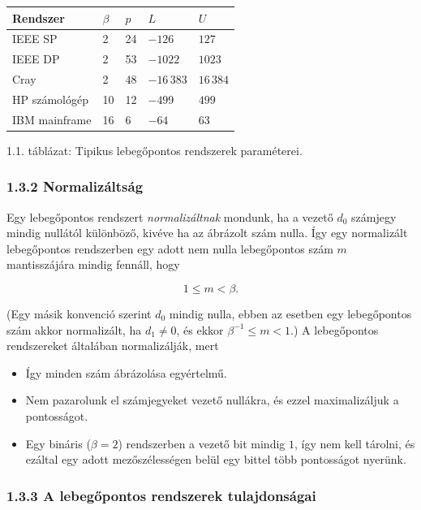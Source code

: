 \documentclass[
  magyar,
  11pt]{article}
\providecommand{\tightlist}{%
  \setlength{\itemsep}{0pt}\setlength{\parskip}{0pt}}
\begin{document}
\begin{longtable}[]{@{}lllll@{}}
\toprule\noalign{}
Rendszer & \(\beta\) & \(p\) & \(L\) & \(U\) \\
\midrule\noalign{}
\endhead
\bottomrule\noalign{}
\endlastfoot
IEEE SP & 2 & 24 & \(-126\) & \(127\) \\
IEEE DP & 2 & 53 & \(-1022\) & \(1023\) \\
Cray & 2 & 48 & \(-16\,383\) & \(16\,384\) \\
HP számológép & 10 & 12 & \(-499\) & \(499\) \\
IBM mainframe & 16 & 6 & \(-64\) & \(63\) \\
\end{longtable}

1.1. táblázat: Tipikus lebegőpontos rendszerek paraméterei.

\subsubsection{1.3.2 Normalizáltság}\label{normalizuxe1ltsuxe1g}

Egy lebegőpontos rendszert \emph{normalizáltnak} mondunk, ha a vezető
\(d_0\) számjegy mindig nullától különböző, kivéve ha az ábrázolt szám
nulla. Így egy normalizált lebegőpontos rendszerben egy adott nem nulla
lebegőpontos szám \(m\) mantisszájára mindig fennáll, hogy

\[1 \leq m < \beta.\]

(Egy másik konvenció szerint \(d_0\) mindig nulla, ebben az esetben egy
lebegőpontos szám akkor normalizált, ha \(d_1 \neq 0\), és ekkor
\(\beta^{-1} \leq m < 1\).) A lebegőpontos rendszereket általában
normalizálják, mert

\begin{itemize}
\tightlist
\item
  Így minden szám ábrázolása egyértelmű.
\item
  Nem pazarolunk el számjegyeket vezető nullákra, és ezzel
  maximalizáljuk a pontosságot.
\item
  Egy bináris (\(\beta = 2\)) rendszerben a vezető bit mindig \(1\), így
  nem kell tárolni, és ezáltal egy adott mezőszélességen belül egy
  bittel több pontosságot nyerünk.
\end{itemize}

\subsubsection{1.3.3 A lebegőpontos rendszerek
tulajdonságai}\label{a-lebegux151pontos-rendszerek-tulajdonsuxe1gai}
\end{document}
